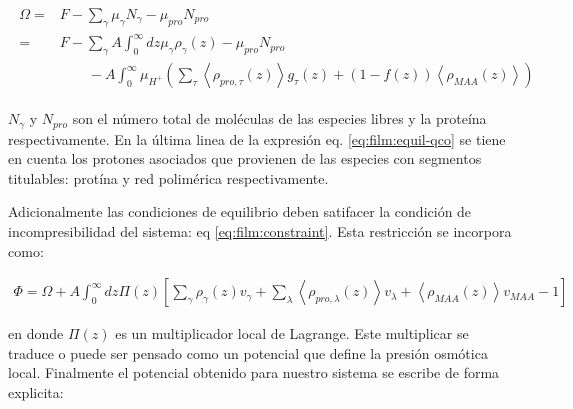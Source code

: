 \begin{align}
	\begin{aligned}
		\Omega = &F - \sum_\gamma \mu_\gamma N_\gamma -  \mu_{pro} N_{pro} \\
			= &F -\sum_\gamma A\int_0^\infty dz \mu_\gamma \rho_\gamma(z) -  \mu_{pro} N_{pro}  \\
			& \qquad -A\int_0^\infty \mu_{H^+} \left( \sum_\tau\left< \rho_{pro,\tau}(z) \right>g_\tau(z) + (1-f(z))\left< \rho_{MAA}(z) \right> \right )
			\end{aligned}
		\label{eq:film:equil-qco}
\end{align}

\noindent $N_\gamma$ y $ N_{pro}$ son el n\'umero total de mol\'eculas de las especies libres y la prote\'ina respectivamente. En la \'ultima linea de la expresi\'on eq. \ref{eq:film:equil-qco} se tiene en cuenta los protones asociados que  provienen de las especies con segmentos titulables: prot\'ina y red polim\'erica respectivamente.


Adicionalmente las condiciones de equilibrio deben satifacer la condici\'on de incompresibilidad del sistema: eq \ref{eq:film:constraint}.  Esta restricci\'on se incorpora como:

\begin{align}
	\Phi = \Omega +A \int_0^\infty dz\Pi(z){\left[\sum_{\gamma}\rho_\gamma(z) v_\gamma + \sum_\lambda{\left<\rho_{pro,\lambda}(z)\right>v_\lambda} + \left<\rho_{MAA}(z)\right>v_{MAA} -1 \right]}
\end{align}


\noindent en donde $\Pi(z)$ es un multiplicador local de Lagrange.  Este multiplicar se traduce o puede ser pensado como un potencial que define la presi\'on osm\'otica local. Finalmente el potencial obtenido para nuestro sistema se escribe de forma explicita:
 
